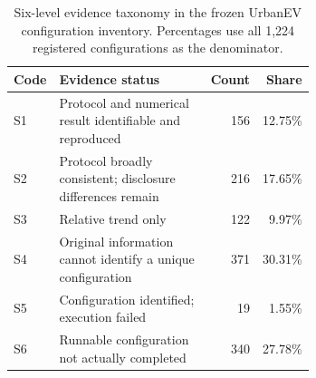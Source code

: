 \begin{table}[t]
\centering
\caption{Six-level evidence taxonomy in the frozen UrbanEV configuration inventory. Percentages use all 1,224 registered configurations as the denominator.}
\label{tab:status}
\small
\begin{tabular}{p{0.07\linewidth}p{0.59\linewidth}rr}
\toprule
Code & Evidence status & Count & Share \\
\midrule
S1 & Protocol and numerical result identifiable and reproduced & 156 & 12.75\% \\
S2 & Protocol broadly consistent; disclosure differences remain & 216 & 17.65\% \\
S3 & Relative trend only & 122 & 9.97\% \\
S4 & Original information cannot identify a unique configuration & 371 & 30.31\% \\
S5 & Configuration identified; execution failed & 19 & 1.55\% \\
S6 & Runnable configuration not actually completed & 340 & 27.78\% \\
\bottomrule
\end{tabular}
\end{table}
